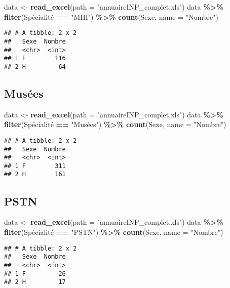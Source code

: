 \documentclass[
]{article}
\newenvironment{Shaded}{\begin{snugshade}}{\end{snugshade}}
\newcommand{\DataTypeTok}[1]{\textcolor[rgb]{0.13,0.29,0.53}{#1}}
\newcommand{\KeywordTok}[1]{\textcolor[rgb]{0.13,0.29,0.53}{\textbf{#1}}}
\newcommand{\NormalTok}[1]{#1}
\newcommand{\OperatorTok}[1]{\textcolor[rgb]{0.81,0.36,0.00}{\textbf{#1}}}
\newcommand{\StringTok}[1]{\textcolor[rgb]{0.31,0.60,0.02}{#1}}
\begin{document}
\begin{Shaded}
\begin{Highlighting}[]
\NormalTok{data \textless{}{-}}\StringTok{ }\KeywordTok{read\_excel}\NormalTok{(}\DataTypeTok{path =} \StringTok{"annuaireINP\_complet.xls"}\NormalTok{)}
\NormalTok{data }\OperatorTok{\%\textgreater{}\%}
\StringTok{  }\KeywordTok{filter}\NormalTok{(Spécialité }\OperatorTok{==}\StringTok{ "MHI"}\NormalTok{) }\OperatorTok{\%\textgreater{}\%}\StringTok{ }
\StringTok{  }\KeywordTok{count}\NormalTok{(Sexe, }\DataTypeTok{name =} \StringTok{"Nombre"}\NormalTok{)}
\end{Highlighting}
\end{Shaded}

\begin{verbatim}
## # A tibble: 2 x 2
##   Sexe  Nombre
##   <chr>  <int>
## 1 F        116
## 2 H         64
\end{verbatim}

\hypertarget{musuxe9es}{%
\subsection{Musées}\label{musuxe9es}}

\begin{Shaded}
\begin{Highlighting}[]
\NormalTok{data \textless{}{-}}\StringTok{ }\KeywordTok{read\_excel}\NormalTok{(}\DataTypeTok{path =} \StringTok{"annuaireINP\_complet.xls"}\NormalTok{)}
\NormalTok{data }\OperatorTok{\%\textgreater{}\%}
\StringTok{  }\KeywordTok{filter}\NormalTok{(Spécialité }\OperatorTok{==}\StringTok{ "Musées"}\NormalTok{) }\OperatorTok{\%\textgreater{}\%}\StringTok{ }
\StringTok{  }\KeywordTok{count}\NormalTok{(Sexe, }\DataTypeTok{name =} \StringTok{"Nombre"}\NormalTok{)}
\end{Highlighting}
\end{Shaded}

\begin{verbatim}
## # A tibble: 2 x 2
##   Sexe  Nombre
##   <chr>  <int>
## 1 F        311
## 2 H        161
\end{verbatim}

\hypertarget{pstn}{%
\subsection{PSTN}\label{pstn}}

\begin{Shaded}
\begin{Highlighting}[]
\NormalTok{data \textless{}{-}}\StringTok{ }\KeywordTok{read\_excel}\NormalTok{(}\DataTypeTok{path =} \StringTok{"annuaireINP\_complet.xls"}\NormalTok{)}
\NormalTok{data }\OperatorTok{\%\textgreater{}\%}
\StringTok{  }\KeywordTok{filter}\NormalTok{(Spécialité }\OperatorTok{==}\StringTok{ "PSTN"}\NormalTok{) }\OperatorTok{\%\textgreater{}\%}\StringTok{ }
\StringTok{  }\KeywordTok{count}\NormalTok{(Sexe, }\DataTypeTok{name =} \StringTok{"Nombre"}\NormalTok{)}
\end{Highlighting}
\end{Shaded}

\begin{verbatim}
## # A tibble: 2 x 2
##   Sexe  Nombre
##   <chr>  <int>
## 1 F         26
## 2 H         17
\end{verbatim}
\end{document}
